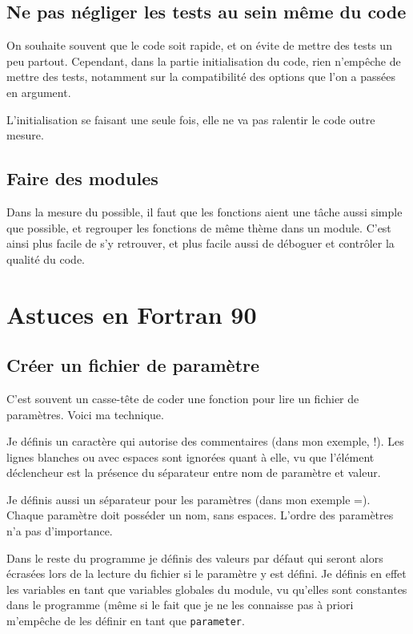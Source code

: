 \subsection{Ne pas négliger les tests au sein même du code}
On souhaite souvent que le code soit rapide, et on évite de mettre des tests un peu partout. Cependant, dans la partie initialisation du code, rien n'empêche de mettre des tests, notamment sur la compatibilité des options que l'on a passées en argument. 

L'initialisation se faisant une seule fois, elle ne va pas ralentir le code outre mesure.

\subsection{Faire des modules}
Dans la mesure du possible, il faut que les fonctions aient une tâche aussi simple que possible, et regrouper les fonctions de même thème dans un module. C'est ainsi plus facile de s'y retrouver, et plus facile aussi de déboguer et contrôler la qualité du code. 

\section{Astuces en Fortran 90}

\subsection{Créer un fichier de paramètre}
C'est souvent un casse-tête de coder une fonction pour lire un fichier de paramètres. Voici ma technique. 

Je définis un caractère qui autorise des commentaires (dans mon exemple, \og !\fg). Les lignes blanches ou avec espaces sont ignorées quant à elle, vu que l'élément déclencheur est la présence du séparateur entre nom de paramètre et valeur. 

Je définis aussi un séparateur pour les paramètres (dans mon exemple \og =\fg). Chaque paramètre doit posséder un nom, sans espaces. L'ordre des paramètres n'a pas d'importance. 

\begin{remarque}
Dans le reste du programme je définis des valeurs par défaut qui seront alors écrasées lors de la lecture du fichier si le paramètre y est défini. Je définis en effet les variables en tant que variables globales du module, vu qu'elles sont constantes dans le programme (même si le fait que je ne les connaisse pas à priori m'empêche de les définir en tant que \texttt{parameter}.
\end{remarque}


